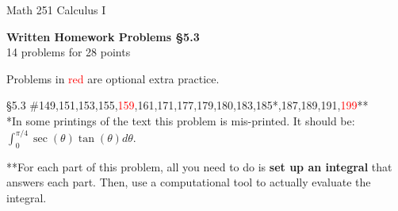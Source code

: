 \documentclass[11pt]{report}
\theoremstyle{plain}
\newcommand{\opt}[1]{\textcolor{red}{#1}}
\begin{document}
\hfill Math 251 Calculus I
\begin{center}
\Large{\textbf{Written Homework Problems \S 5.3}} \\
14 problems for 28 points\\
\end{center}

Problems in \textcolor{red}{red} are optional extra practice.\\

\begin{description}
\item{\S 5.3} \#149,151,153,155,\opt{159},161,171,177,179,180,183,185*,187,189,191,\opt{199}**\\

*In some printings of the text this problem is mis-printed. It should be: $\displaystyle \int_0^{\pi/4} \sec(\theta) \tan(\theta) d\theta.$

**For each part of this problem, all you need to do is \textbf{set up an integral} that answers each part. Then, use a computational tool to actually evaluate the integral.


\end{description}
\end{document}
